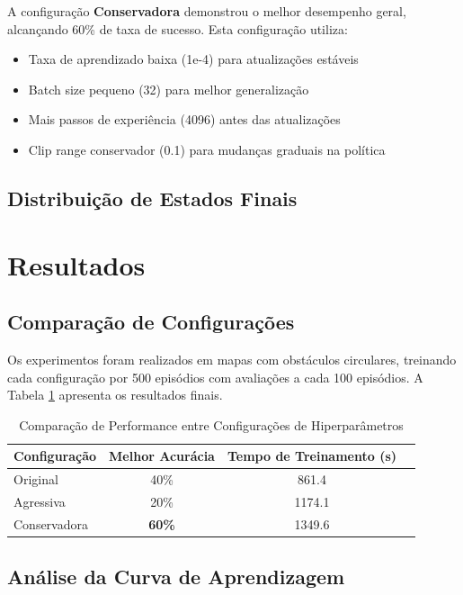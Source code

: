 \documentclass[9pt,a4paper,twoside]{tau}
\begin{document}
A configuração \textbf{Conservadora} demonstrou o melhor desempenho geral, alcançando 60\% de taxa de sucesso. Esta configuração utiliza:
\begin{itemize}
    \item Taxa de aprendizado baixa (1e-4) para atualizações estáveis
    \item Batch size pequeno (32) para melhor generalização
    \item Mais passos de experiência (4096) antes das atualizações
    \item Clip range conservador (0.1) para mudanças graduais na política
\end{itemize}

\subsection{Distribuição de Estados Finais}

\section{Resultados}

\subsection{Comparação de Configurações}

Os experimentos foram realizados em mapas com obstáculos circulares, treinando cada configuração por 500 episódios com avaliações a cada 100 episódios. A Tabela \ref{tab:results} apresenta os resultados finais.

\begin{table}[htbp]
    \caption{Comparação de Performance entre Configurações de Hiperparâmetros}
    \label{tab:results}
    \centering
    \begin{tabular}{lccc}
        \toprule
        \textbf{Configuração} & \textbf{Melhor Acurácia} & \textbf{Tempo de Treinamento (s)} \\
        \midrule
        Original & 40\% & 861.4 \\
        Agressiva & 20\% & 1174.1 \\
        Conservadora & \textbf{60\%} & 1349.6 \\
        \bottomrule
    \end{tabular}
\end{table}

\subsection{Análise da Curva de Aprendizagem}
\end{document}
